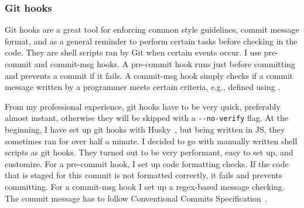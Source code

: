 \subsubsection{Git hooks}\label{sec:git-hooks}

Git hooks are a great tool
for enforcing common style guidelines,
commit message format,
and as a general reminder
to perform certain tasks before checking in the code.
They are shell scripts ran by Git
when certain events occur.
I use pre-commit and commit-msg hooks.
A pre-commit hook runs just before committing
and prevents a commit if it fails.
A commit-msg hook simply checks
if a commit message written by a programmer
meets certain criteria, e.g.,
defined using .

From my professional experience,
git hooks have to be very quick,
preferably almost instant,
otherwise they will be skipped
with a \texttt{{-}{-}no-verify} flag.
At the beginning,
I have set up git hooks
with Husky~\cite{typicode_husky_2022},
but being written in \ac{JS},
they sometimes ran for over half a minute.
I decided to go with manually written shell scripts
as git hooks.
They turned out to be very performant,
easy to set up, and customize.
For a pre-commit hook,
I set up code formatting checks.
If the code that is staged for this commit
is not formatted correctly,
it fails and prevents committing.
For a commit-msg hook I set up a \ac{regex}-based
message checking.
The commit message has to follow
Conventional Commits Specification~\cite{petrungaro_conventional_2019}.
